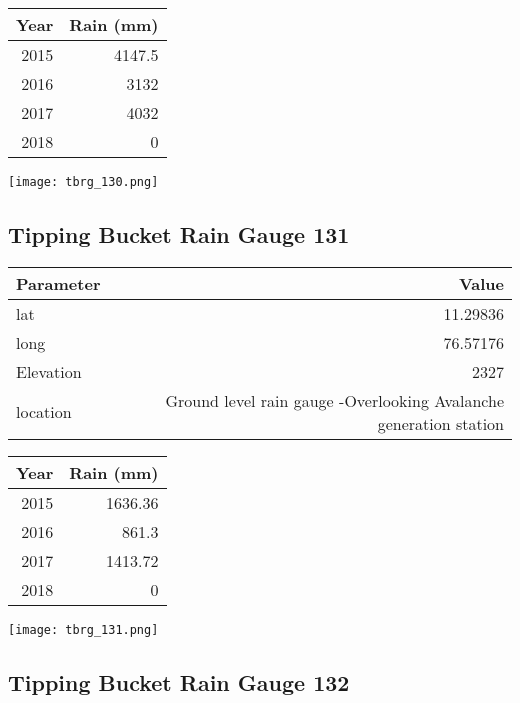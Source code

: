 \documentclass[a4paper]{article}
\begin{document}
\begin{center}
\begin{tabular}{rr}
Year & Rain (mm)\\
\hline
2015 & 4147.5\\
2016 & 3132\\
2017 & 4032\\
2018 & 0\\
\end{tabular}
\end{center}

\begin{center}
\texttt{[image: tbrg\_130.png]}
\end{center}

\newpage


\subsection*{Tipping Bucket Rain Gauge 131}
\label{sec:org4957dca}

\begin{center}
\begin{tabular}{lr}
Parameter & Value\\
\hline
lat & 11.29836\\
long & 76.57176\\
Elevation & 2327\\
location & Ground level rain gauge -Overlooking Avalanche generation station\\
\end{tabular}
\end{center}

\begin{center}
\begin{tabular}{rr}
Year & Rain (mm)\\
\hline
2015 & 1636.36\\
2016 & 861.3\\
2017 & 1413.72\\
2018 & 0\\
\end{tabular}
\end{center}

\begin{center}
\texttt{[image: tbrg\_131.png]}
\end{center}

\newpage

\subsection*{Tipping Bucket Rain Gauge 132}
\label{sec:orga0e3d56}
\end{document}
